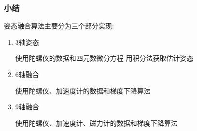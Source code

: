 \subsubsection{小结}
姿态融合算法主要分为三个部分实现:
\begin{enumerate}
    \item 3轴姿态

        使用陀螺仪的数据和四元数微分方程 用积分法获取估计姿态
    \item 6轴融合

        使用陀螺仪、加速度计的数据和梯度下降算法
    \item 9轴融合

        使用陀螺仪、加速度计、磁力计的数据和梯度下降算法
\end{enumerate}

